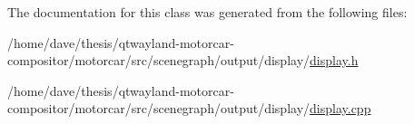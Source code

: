 The documentation for this class was generated from the following files\-:\begin{DoxyCompactItemize}
\item 
/home/dave/thesis/qtwayland-\/motorcar-\/compositor/motorcar/src/scenegraph/output/display/\hyperlink{display_8h}{display.\-h}\item 
/home/dave/thesis/qtwayland-\/motorcar-\/compositor/motorcar/src/scenegraph/output/display/\hyperlink{display_8cpp}{display.\-cpp}\end{DoxyCompactItemize}
